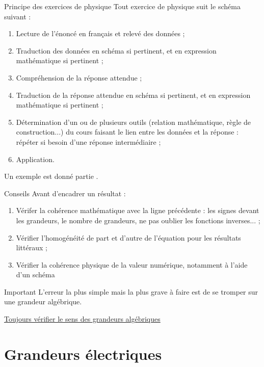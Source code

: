 \documentclass[10pt,a5paper,notitlepage]{book}
\begin{document}
\begin{NCprop}{Principe des exercices de physique}
    Tout exercice de physique suit le schéma suivant :
    \begin{enumerate}
        \item Lecture de l'énoncé en français et relevé des données ;
        \item Traduction des données en schéma si pertinent, et en expression
            mathématique si pertinent ;
        \item Compréhension de la réponse attendue ;
        \item Traduction de la réponse attendue en schéma si pertinent, et en
            expression mathématique si pertinent ;
        \item Détermination d'un ou de plusieurs outils (relation mathématique,
            règle de construction...) du cours faisant le lien entre les données
            et la réponse : répéter si besoin d'une réponse intermédiaire ;
        \item Application.
    \end{enumerate}
    Un exemple est donné partie .
\end{NCprop}

\begin{NCcoro}{Conseils}
    Avant d'encadrer un résultat :
    \begin{enumerate}
        \item Vérifer la cohérence mathématique avec la ligne précédente : les
            signes devant les grandeurs, le nombre de grandeurs, ne pas oublier
            les fonctions inverses... ;
        \item Vérifier l'homogénéité de part et d'autre de l'équation pour les
            résultats littéraux ;
        \item Vérifier la cohérence physique de la valeur numérique, notamment à
            l'aide d'un schéma
    \end{enumerate}
\end{NCcoro}

\begin{NCimpo}{Important}
    L'erreur la plus simple mais la plus grave à faire est de se tromper sur une
    grandeur algébrique.
    \begin{center}
        \underline{Toujours vérifier le sens des grandeurs algébriques} 
    \end{center}
\end{NCimpo}

\chapter{Grandeurs électriques}\label{ch:O1}
\vspace*{-47pt}
\end{document}
